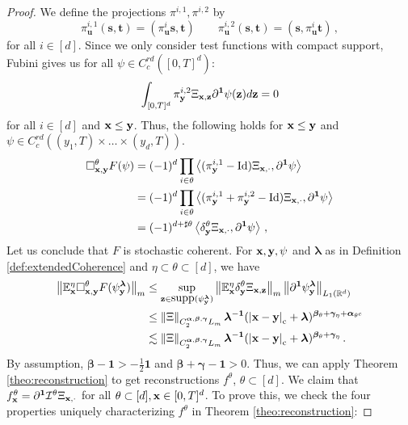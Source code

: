 \documentclass[12pt]{article}
\numberwithin{equation}{section}
\theoremstyle{plain}
\theoremstyle{definition}
\newcommand{\compAbs}[1]{\left\vert#1\right\vert_{\text{c}}}
\newcommand{\scalar}[1]{\left\langle #1 \right\rangle}
\newcommand{\norm}[1]{\left\Vert #1\right\Vert}
\newcommand{\Id}{\mbox{Id}}
\def\bR{\mathbb{R}}\def\bS{\mathbb{S}}
\def\bE{\mathbb{E}}\def\bW{\mathbb{W}}
\def\fs{\mathbf s}\def\ft{\mathbf t}
\def\fu{\mathbf u}\def\fv{\mathbf v}
\def\fy{\mathbf y}\def\fz{\mathbf z}
\def\falpha{{\boldsymbol\alpha}}
\def\fbeta{{\boldsymbol\beta}}
\def\fgamma{{\boldsymbol\gamma}}
\def\flambda{{\boldsymbol\lambda}}
\def\fone{{\boldsymbol 1}}
\def\supp{\mbox{supp}}
\begin{document}
\begin{proof}
    We define the projections $\pi^{i,1},\pi^{i,2}$ by
    \begin{equation*}
        \pi^{i,1}_\fu(\fs,\ft) = (\pi_\fu^i\fs,\ft) \qquad \pi^{i,2}_\fu(\fs,\ft) = (\fs,\pi^i_\fu\ft)\,,       
    \end{equation*}
    for all $i\in[d]$. Since we only consider test functions with compact support, Fubini gives us for all $\psi\in C_c^{rd}([0,T]^d)$:
    \begin{equation*}
        \int_{[0,T]^d} \pi^{i,2}_\fy\Xi_{\fx,\fz}\partial^\fone\psi(\fz) d\fz = 0
    \end{equation*}
    for all $i\in[d]$ and $\fx\le\fy$. Thus, the following holds for $\fx\le\fy$ and $\psi\in C_c^{rd}((y_1,T)\times\dots\times(y_d,T))$.
    \begin{align*}
        \square^\theta_{\fx,\fy} F(\psi) &= (-1)^d\prod_{i\in\theta}\scalar{(\pi_\fy^{i,1}-\Id)\Xi_{\fx,\cdot},\partial^\fone\psi} \\
        &= (-1)^d\prod_{i\in\theta}\scalar{(\pi_\fy^{i,1}+\pi_\fy^{i,2}-\Id)\Xi_{\fx,\cdot},\partial^\fone\psi}\\
        &= (-1)^{d+\sharp{\theta}}\scalar{\delta^\theta_\fy\Xi_{\fx,\cdot},\partial^\fone\psi}\,,
    \end{align*}
    Let us conclude that $F$ is stochastic coherent. For $\fx,\fy,\psi$ and $\flambda$ as in Definition \ref{def:extendedCoherence} and $\eta\subset\theta\subset[d]$, we have
    \begin{align}
        \norm{\bE^\eta_\fx \square^\theta_{\fx,\fy}F(\psi_\fy^\flambda)}_m &\le \sup_{\fz\in\supp(\psi_\fy^\flambda)}\norm{\bE^\eta_\fx\delta^\theta_\fy\Xi_{\fx,\fz}}_m \norm{\partial^\fone\psi_\fy^\flambda}_{L_1(\bR^d)}\nonumber\\& \le \norm{\Xi}_{C_2^{\falpha,\fbeta,\fgamma}L_m}\flambda^{-\fone}(\compAbs{\fx-\fy}+\flambda)^{\fbeta_\theta+\fgamma_\eta+\falpha_{\theta^c}}\label{ineq:cohFromSewing}\\
        &\lesssim \norm{\Xi}_{C_2^{\falpha,\fbeta,\fgamma}L_m}\flambda^{-\fone}(\compAbs{\fx-\fy}+\flambda)^{\fbeta_\theta+\fgamma_\eta}\,.\nonumber
    \end{align}
    By assumption, $\fbeta-\fone > -\frac 12\fone$ and $\fbeta+\fgamma-\fone > 0$. Thus, we can apply Theorem \ref{theo:reconstruction} to get reconstructions $f^\theta$, $\theta\subset[d]$. We claim that $f^\theta_\fx = \partial^\fone \cI^\theta\Xi_{\fx,\cdot}$ for all $\theta\subset[d],\mathbf x\in[0,T]^d$. To prove this, we check the four properties uniquely characterizing $f^\theta$ in Theorem \ref{theo:reconstruction}:

\end{proof}
\end{document}
